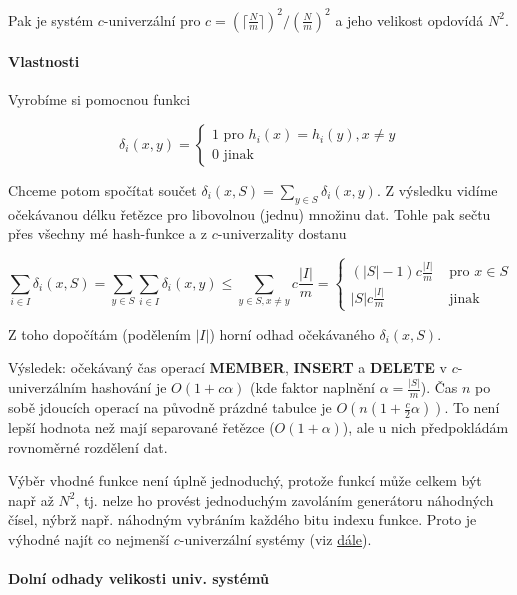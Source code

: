 \documentclass[11pt]{report} %
\numberwithin{equation}{section}
\begin{document}
Pak je systém $c$-univerzální pro
$c = \left(\lceil\frac{N}{m}\rceil\right)^2 / \left(\frac{N}{m}\right)^2$
a jeho velikost opdovídá $N^2$.

\paragraph{Vlastnosti}\label{vlastnosti}

Vyrobíme si pomocnou funkci

$$\delta_i(x,y)= \begin{cases}1 \mbox{ pro } h_i(x)=h_i(y), x\neq y \\ 0 \mbox{ jinak }\end{cases}$$

Chceme potom spočítat součet
$\delta_i(x,S)=\sum_{y\in S}\delta_i(x,y)$. Z výsledku vidíme
očekávanou délku řetězce pro libovolnou (jednu) množinu dat. Tohle pak
sečtu přes všechny mé hash-funkce a z $c$-univerzality dostanu

$$\sum_{i\in I}\delta_i(x,S)=\sum_{y\in S}\sum_{i\in I}\delta_i(x,y) \leq \sum_{y\in S,x\neq y} c\frac{|I|}{m} = \begin{cases} (|S|-1)c\frac{|I|}{m} & \mbox{ pro } x\in S \\ |S|c\frac{|I|}{m} & \mbox{ jinak }  \end{cases}$$

Z toho dopočítám (podělením $|I|$) horní odhad očekávaného
$\delta_i(x,S)$.

Výsledek: očekávaný čas operací \textbf{MEMBER}, \textbf{INSERT} a
\textbf{DELETE} v $c$-univerzálním hashování je
$O(1+c\alpha)$ (kde faktor naplnění $\alpha=\frac{|S|}{m}$).
Čas $n$ po sobě jdoucích operací na původně prázdné tabulce je
$O(n(1+\frac{c}{2}\alpha))$. To není lepší hodnota než mají
separované řetězce ($O(1+\alpha)$), ale u nich předpokládám
rovnoměrné rozdělení dat.

Výběr vhodné funkce není úplně jednoduchý, protože funkcí může celkem
být např až $N^2$, tj. nelze ho provést jednoduchým zavoláním
generátoru náhodných čísel, nýbrž např. náhodným vybráním každého bitu
indexu funkce. Proto je výhodné najít co nejmenší $c$-univerzální
systémy (viz
\protect\hyperlink{Dolnuxed_odhady_velikosti_univerzuxe1lnuxedch_systuxe9mux16f}{dále}).

\paragraph{Dolní odhady velikosti univ.
	systémů}\label{dolnuxed-odhady-velikosti-univ.-systuxe9mux16f}
\end{document}
